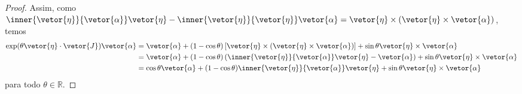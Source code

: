 \begin{proof}
    Assim, como \(\inner{\vetor{\eta}}{\vetor{\alpha}}\vetor{\eta} - \inner{\vetor{\eta}}{\vetor{\eta}}\vetor{\alpha} = \vetor{\eta}\times(\vetor{\eta} \times \vetor{\alpha})\), temos
    \begin{align*}
        \exp(\theta \vetor{\eta}\cdot \vetor{J}) \vetor{\alpha}
        &= \vetor{\alpha} + (1 - \cos\theta) \left[\vetor{\eta} \times (\vetor{\eta} \times \vetor{\alpha})\right] + \sin\theta \vetor{\eta}\times \vetor{\alpha}\\
        &= \vetor{\alpha} + (1 - \cos\theta) \left(\inner{\vetor{\eta}}{\vetor{\alpha}}\vetor{\eta} - \vetor{\alpha}\right) + \sin\theta \vetor{\eta}\times \vetor{\alpha} \\
                                                                &= \cos\theta\vetor{\alpha} + (1 - \cos\theta) \inner{\vetor{\eta}}{\vetor{\alpha}}\vetor{\eta} + \sin\theta \vetor{\eta}\times \vetor{\alpha}
    \end{align*}
    para todo \(\theta \in \mathbb{R}\).
\end{proof}
